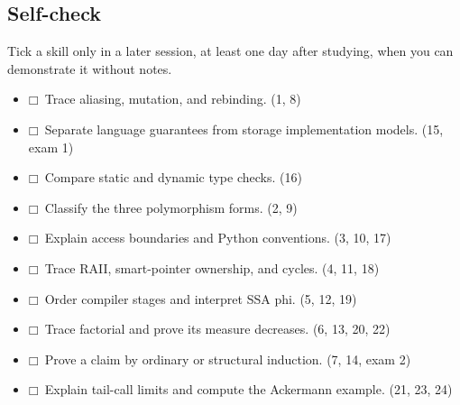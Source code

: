 \documentclass[11pt]{article}
\begin{document}
\begin{keepsection}
\section{Self-check}

Tick a skill only in a later session, at least one day after studying, when you can demonstrate it without notes.

\begin{itemize}
\item $\mdlgwhtsquare$\ Trace aliasing, mutation, and rebinding. (1, 8)
\item $\mdlgwhtsquare$\ Separate language guarantees from storage implementation models. (15, exam 1)
\item $\mdlgwhtsquare$\ Compare static and dynamic type checks. (16)
\item $\mdlgwhtsquare$\ Classify the three polymorphism forms. (2, 9)
\item $\mdlgwhtsquare$\ Explain access boundaries and Python conventions. (3, 10, 17)
\item $\mdlgwhtsquare$\ Trace RAII, smart-pointer ownership, and cycles. (4, 11, 18)
\item $\mdlgwhtsquare$\ Order compiler stages and interpret SSA phi. (5, 12, 19)
\item $\mdlgwhtsquare$\ Trace factorial and prove its measure decreases. (6, 13, 20, 22)
\item $\mdlgwhtsquare$\ Prove a claim by ordinary or structural induction. (7, 14, exam 2)
\item $\mdlgwhtsquare$\ Explain tail-call limits and compute the Ackermann example. (21, 23, 24)
\end{itemize}
\end{keepsection}


\clearpage
\end{document}
